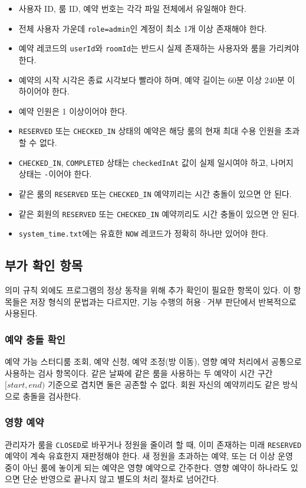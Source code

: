 \documentclass[a4paper,10pt]{article}
\begin{document}
\begin{itemize}[leftmargin=1.8em,itemsep=0.25em]
\item 사용자 ID, 룸 ID, 예약 번호는 각각 파일 전체에서 유일해야 한다.
\item 전체 사용자 가운데 \texttt{role=admin}인 계정이 최소 1개 이상 존재해야 한다.
\item 예약 레코드의 \texttt{userId}와 \texttt{roomId}는 반드시 실제 존재하는 사용자와 룸을 가리켜야 한다.
\item 예약의 시작 시각은 종료 시각보다 빨라야 하며, 예약 길이는 60분 이상 240분 이하이어야 한다.
\item 예약 인원은 1 이상이어야 한다.
\item \texttt{RESERVED} 또는 \texttt{CHECKED\_IN} 상태의 예약은 해당 룸의 현재 최대 수용 인원을 초과할 수 없다.
\item \texttt{CHECKED\_IN}, \texttt{COMPLETED} 상태는 \texttt{checkedInAt} 값이 실제 일시여야 하고, 나머지 상태는 \texttt{-}이어야 한다.
\item 같은 룸의 \texttt{RESERVED} 또는 \texttt{CHECKED\_IN} 예약끼리는 시간 충돌이 있으면 안 된다.
\item 같은 회원의 \texttt{RESERVED} 또는 \texttt{CHECKED\_IN} 예약끼리도 시간 충돌이 있으면 안 된다.
\item \texttt{system\_time.txt}에는 유효한 \texttt{NOW} 레코드가 정확히 하나만 있어야 한다.
\end{itemize}

\subsection{부가 확인 항목}
의미 규칙 외에도 프로그램의 정상 동작을 위해 추가 확인이 필요한 항목이 있다. 이 항목들은 저장 형식의 문법과는 다르지만, 기능 수행의 허용·거부 판단에서 반복적으로 사용된다.

\subsubsection{예약 충돌 확인}
예약 가능 스터디룸 조회, 예약 신청, 예약 조정(방 이동), 영향 예약 처리에서 공통으로 사용하는 검사 항목이다. 같은 날짜에 같은 룸을 사용하는 두 예약이 시간 구간 \([start, end)\) 기준으로 겹치면 둘은 공존할 수 없다. 회원 자신의 예약끼리도 같은 방식으로 충돌을 검사한다.

\subsubsection{영향 예약}
관리자가 룸을 \texttt{CLOSED}로 바꾸거나 정원을 줄이려 할 때, 이미 존재하는 미래 \texttt{RESERVED} 예약이 계속 유효한지 재판정해야 한다. 새 정원을 초과하는 예약, 또는 더 이상 운영 중이 아닌 룸에 놓이게 되는 예약은 영향 예약으로 간주한다. 영향 예약이 하나라도 있으면 단순 반영으로 끝나지 않고 별도의 처리 절차로 넘어간다.
\end{document}
